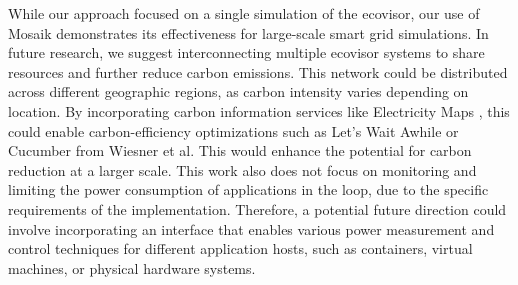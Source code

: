 While our approach focused on a single simulation of the ecovisor, our use of
Mosaik demonstrates its effectiveness for large-scale smart grid simulations. In
future research, we suggest interconnecting multiple ecovisor systems to share
resources and further reduce carbon emissions. This network could be distributed
across different geographic regions, as carbon intensity varies depending on
location. By incorporating carbon information services like Electricity Maps
\cite{electricity_maps}, this could enable carbon-efficiency optimizations such
as Let’s Wait Awhile \cite{wiesner2021} or Cucumber \cite{wiesner2022} from
Wiesner et al. This would enhance the potential for carbon reduction at a larger
scale. This work also does not focus on monitoring and limiting the power
consumption of applications in the loop, due to the specific requirements of the
implementation. Therefore, a potential future direction could involve
incorporating an interface that enables various power measurement and control
techniques for different application hosts, such as containers, virtual
machines, or physical hardware systems.
